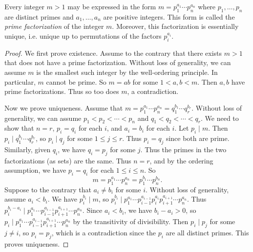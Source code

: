 \begin{theorem}
  Every integer $m > 1$ may be
  expressed in the form
  $m = p_1^{a_1} \cdots p_n^{a_n}$
  where $p_1, \dots, p_n$ are distinct
  primes and $a_1, \dots, a_n$ are
  positive integers. This form is
  called the \emph{prime factorization}
  of the integer $m$. Moreover, this
  factorization is essentially unique, i.e.
  unique up to permutations
  of the factors $p_i^{a_i}$.
\end{theorem}

\begin{proof}
  We first prove existence.
  Assume to the contrary that there exists
  $m > 1$ that does not have a prime
  factorization. Without loss of generality,
  we can assume $m$ is the smallest such
  integer by the well-ordering principle.
  In particular, $m$ cannot be prime.
  So $m = ab$ for some $1 < a, b < m$. Then
  $a, b$ have prime factorizations. Thus
  so too does $m$, a contradiction.

  Now we prove uniqueness. Assume
  that $m = p_1^{a_1} \cdots p_n^{a_n} = q_1^{b_1} \cdots q_r^{b_r}$.
  Without loss of generality, we
  can assume $p_1 < p_2 < \cdots < p_n$
  and $q_1 < q_2 < \cdots < q_r$.
  We need to show that
  $n = r$, $p_i = q_i$ for each $i$, and
  $a_i = b_i$ for each $i$. Let $p_i \mid m$.
  Then $p_i \mid q_1^{b_1} \cdots q_r^{b_r}$,
  so $p_i \mid q_j$ for some $1 \le j \le r$.
  Thus $p_i = q_j$ since both are prime.
  Similarly, given $q_i$, we have
  $q_i = p_j$ for some $j$. Thus the
  primes in the two factorizations (as
  sets) are the same. Thus $n = r$, and
  by the ordering assumption, we have
  $p_i = q_i$ for each $1 \le i \le n$.
  So
  \[
    m = p_1^{a_1} \cdots p_n^{a_n}
    = p_1^{b_1} \cdots p_n^{b_n}.
  \]
  Suppose to the contrary that
  $a_i \ne b_i$ for some $i$. Without
  loss of generality, assume $a_i < b_i$.
  We have $p_i^{b_i} \mid m$, so
  $p_i^{b_i} \mid p_1^{a_1} \cdots p_{i - 1}^{a_{i - 1}} p_i^{a_i} p_{i + 1}^{a_{i + 1}} \cdots p_n^{a_n}$.
  Thus $p_i^{b_i - a_i} \mid p_1^{a_1} \cdots p_{i - 1}^{a_{i - 1}} p_{i + 1}^{a_{i + 1}} \cdots p_n^{a_n}$.
  Since $a_i < b_i$, we have
  $b_i - a_i > 0$, so
  $p_i \mid p_1^{a_1} \cdots p_{i - 1}^{a_{i - 1}} p_{i + 1}^{a_{i + 1}} \cdots p_n^{a_n}$
  by the transitivity of divisibility.
  Then $p_i \mid p_j$ for some $j \ne i$,
  so $p_i = p_j$, which is a contradiction
  since the $p_i$ are all distinct primes.
  This proves uniqueness.
\end{proof}

